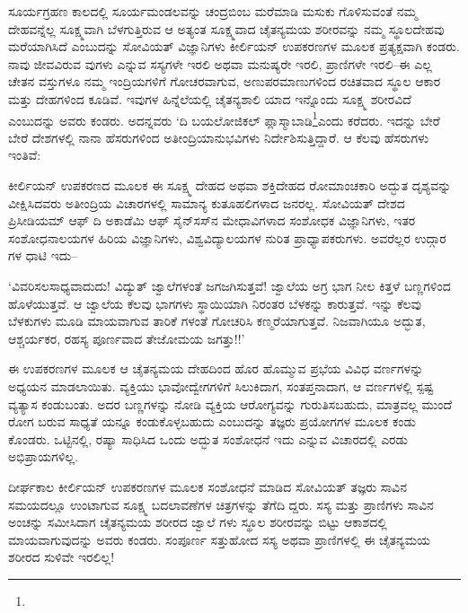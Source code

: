 ಸೂರ್ಯಗ್ರಹಣ ಕಾಲದಲ್ಲಿ ಸೂರ್ಯಮಂಡಲವನ್ನು ಚಂದ್ರಬಿಂಬ ಮರೆಮಾಡಿ ಮಸುಕು ಗೊಳಿಸುವಂತೆ ನಮ್ಮ ದೇಹವನ್ನೆಲ್ಲ ಸೂಕ್ಷ್ಮವಾಗಿ ಬೆಳಗುತ್ತಿರುವ ಆ ಅತ್ಯಂತ ಸೂಕ್ಷ್ಮವಾದ ಚೈತನ್ಯಮಯ ಶರೀರವನ್ನು ನಮ್ಮ ಸ್ಥೂಲದೇಹವು ಮರೆಯಾಗಿಸಿದೆ ಎಂಬುದನ್ನು ಸೋವಿಯತ್ ವಿಜ್ಞಾನಿಗಳು ಕೀರ್ಲಿಯನ್ ಉಪಕರಣಗಳ ಮೂಲಕ ಪ್ರತ್ಯಕ್ಷವಾಗಿ ಕಂಡರು. ನಾವು ಜೀವವಿರುವ ವುಗಳು ಎನ್ನುವ ಸಸ್ಯಗಳೇ ಇರಲಿ ಅಥವಾ ಮನುಷ್ಯರೇ ಇರಲಿ, ಪ್ರಾಣಿಗಳೇ ಇರಲಿ–ಈ ಎಲ್ಲ ಚೇತನ ವಸ್ತುಗಳೂ ನಮ್ಮ ಇಂದ್ರಿಯಗಳಿಗೆ ಗೋಚರವಾಗುವ, ಅಣುಪರಮಾಣುಗಳಿಂದ ರಚಿತವಾದ ಸ್ಥೂಲ ಆಕಾರ ಮತ್ತು ದೇಹಗಳಿಂದ ಕೂಡಿವೆ. ಇವುಗಳ ಹಿನ್ನೆಲೆಯಲ್ಲಿ ಚೈತನ್ಯಶಾಲಿ ಯಾದ ಇನ್ನೊಂದು ಸೂಕ್ಷ್ಮ ಶರೀರವಿದೆ ಎಂಬುದನ್ನು ಅವರು ಕಂಡರು. ಅದನ್ನವರು ‘ದಿ ಬಯಲೋಜಿಕಲ್ ಪ್ಲಾಸ್ಮಾಬಾಡಿ\footnote{}ಎಂದು ಕರೆದರು. ಇದನ್ನು ಬೇರೆ ಬೇರೆ ದೇಶಗಳಲ್ಲಿ ನಾನಾ ಹೆಸರುಗಳಿಂದ ಅತೀಂದ್ರಿಯಾನುಭವಿಗಳು ನಿರ್ದೇಶಿಸುತ್ತಿದ್ದಾರೆ. ಆ ಕೆಲವು ಹೆಸರುಗಳು ಇಂತಿವೆ: 

ಕೀರ್ಲಿಯನ್ ಉಪಕರಣದ ಮೂಲಕ ಈ ಸೂಕ್ಷ್ಮ ದೇಹದ ಅಥವಾ ಶಕ್ತಿದೇಹದ ರೋಮಾಂಚಕಾರಿ ಅದ್ಭುತ ದೃಶ್ಯವನ್ನು ವೀಕ್ಷಿಸಿದವರು ಅತೀಂದ್ರಿಯ ವಿಚಾರಗಳಲ್ಲಿ ಸಾಮಾನ್ಯ ಕುತೂಹಲಿಗಳಾದ ಜನರಲ್ಲ. ಸೋವಿಯತ್ ದೇಶದ ಪ್ರಿಸೀಡಿಯಮ್ ಆಫ್ ದಿ ಅಕಾಡೆಮಿ ಆಫ್ ಸೈನ್​ಸಸ್​ನ ಮೇಧಾವಿಗಳಾದ ಸಂಶೋಧಕ ವಿಜ್ಞಾನಿಗಳು, ಇತರ ಸಂಶೋಧನಾಲಯಗಳ ಹಿರಿಯ ವಿಜ್ಞಾನಿಗಳು, ವಿಶ್ವವಿದ್ಯಾಲಯಗಳ ನುರಿತ ಪ್ರಾಧ್ಯಾಪಕರುಗಳು. ಅವರೆಲ್ಲರ ಉದ್ಗಾರ ಗಳ ಧಾಟಿ ಇದು–

‘ವಿವರಿಸಲಸಾಧ್ಯವಾದುದು! ವಿದ್ಯುತ್ ಜ್ವಾಲೆಗಳಂತೆ ಜಗಜಗಿಸುತ್ತವೆ! ಜ್ವಾಲೆಯ ಅಗ್ರ ಭಾಗ ನೀಲ ಕಿತ್ತಳೆ ಬಣ್ಣಗಳಿಂದ ಹೊಳೆಯುತ್ತವೆ. ಆ ಜ್ವಾಲೆಯ ಕೆಲವು ಭಾಗಗಳು ಸ್ಥಾಯಿಯಾಗಿ ನಿರಂತರ ಬೆಳಕನ್ನು ಕಾರುತ್ತವೆ. ಇನ್ನು ಕೆಲವು ಬೆಳಕುಗಳು ಮೂಡಿ ಮಾಯವಾಗುವ ತಾರಿಕೆ ಗಳಂತೆ ಗೋಚರಿಸಿ ಕಣ್ಮರೆಯಾಗುತ್ತವೆ. ನಿಜವಾಗಿಯೂ ಅದ್ಭುತ, ಆಶ್ಚರ್ಯಕರ, ರಹಸ್ಯ ಪೂರ್ಣವಾದ ತೇಜೋಮಯ ಜಗತ್ತು!!’

ಈ ಉಪಕರಣಗಳ ಮೂಲಕ ಆ ಚೈತನ್ಯಮಯ ದೇಹದಿಂದ ಹೊರ ಹೊಮ್ಮುವ ಪ್ರಭೆಯ ವಿವಿಧ ವರ್ಣಗಳನ್ನು ಅಧ್ಯಯನ ಮಾಡಲಾಯಿತು. ವ್ಯಕ್ತಿಯು ಭಾವೋದ್ವೇಗಗಳಿಗೆ ಸಿಲುಕಿದಾಗ, ಸಂತಪ್ತನಾದಾಗ, ಆ ವರ್ಣಗಳಲ್ಲಿ ಸ್ಪಷ್ಟ ವ್ಯತ್ಯಾಸ ಕಂಡುಬಂತು. ಅದರ ಬಣ್ಣಗಳನ್ನು ನೋಡಿ ವ್ಯಕ್ತಿಯ ಆರೋಗ್ಯವನ್ನು ಗುರುತಿಸಬಹುದು, ಮಾತ್ರವಲ್ಲ ಮುಂದೆ ರೋಗ ಬರುವ ಸಾಧ್ಯತೆ ಯನ್ನೂ ಕಂಡುಕೊಳ್ಳಬಹುದು ಎಂಬುದನ್ನು ತಜ್ಞರು ಪ್ರಯೋಗಗಳ ಮೂಲಕ ಕಂಡು ಕೊಂಡರು. ಒಟ್ಟಿನಲ್ಲಿ, ರಷ್ಯಾ ಸಾಧಿಸಿದ ಒಂದು ಅದ್ಭುತ ಸಂಶೋಧನೆ ಇದು ಎನ್ನುವ ವಿಚಾರದಲ್ಲಿ ಎರಡು ಅಭಿಪ್ರಾಯಗಳಿಲ್ಲ.

ದೀರ್ಘಕಾಲ ಕೀರ್ಲಿಯನ್ ಉಪಕರಣಗಳ ಮೂಲಕ ಸಂಶೋಧನೆ ಮಾಡಿದ ಸೋವಿಯತ್ ತಜ್ಞರು ಸಾವಿನ ಸಮಯದಲ್ಲೂ ಉಂಟಾಗುವ ಸೂಕ್ಷ್ಮ ಬದಲಾವಣೆಗಳ ಚಿತ್ರಗಳನ್ನು ತೆಗೆದಿ ದ್ದರು. ಸಸ್ಯ ಮತ್ತು ಪ್ರಾಣಿಗಳು ಸಾವಿನ ಅಂಚನ್ನು ಸಮೀಸಿದಾಗ ಚೈತನ್ಯಮಯ ಶರೀರದ ಜ್ವಾಲೆ ಗಳು ಸ್ಥೂಲ ಶರೀರವನ್ನು ಬಿಟ್ಟು ಆಕಾಶದಲ್ಲಿ ಮಾಯವಾಗುವುದನ್ನು ಅವರು ಕಂಡರು. ಸಂಪೂರ್ಣ ಸತ್ತುಹೋದ ಸಸ್ಯ ಅಥವಾ ಪ್ರಾಣಿಗಳಲ್ಲಿ ಈ ಚೈತನ್ಯಮಯ ಶರೀರದ ಸುಳಿವೇ ಇರಲಿಲ್ಲ!

